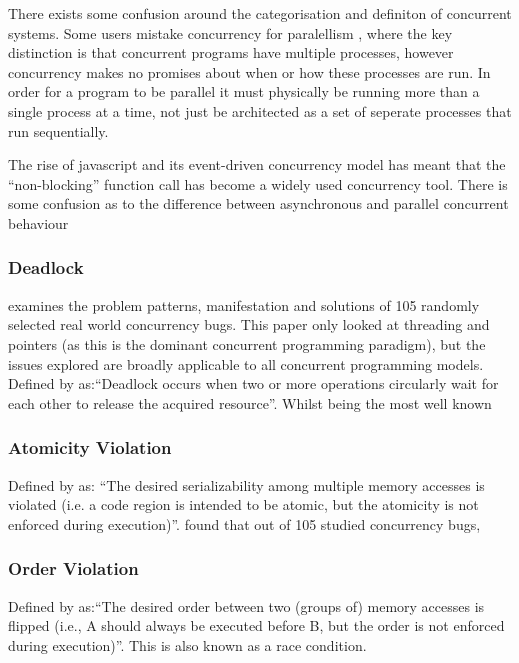 \documentclass{sig-alternate}
\begin{document}
There exists some confusion around the categorisation and definiton of concurrent systems. Some users mistake concurrency for paralellism \cite{pike13:_concur_paral}, where the key distinction is that concurrent programs have multiple processes, however concurrency makes no promises about when or how these processes are run. In order for a program to be parallel it must physically be running more than a single process at a time, not just be architected as a set of seperate processes that run sequentially.

The rise of javascript and its event-driven concurrency model has meant that the ``non-blocking'' function call has become a widely used concurrency tool. There is some confusion as to the difference between asynchronous and parallel concurrent behaviour

\subsubsection{Deadlock}
\cite{shanlu08:_learn_mistak_compr_study_real} examines the problem patterns, manifestation and solutions of 105 randomly selected real world concurrency bugs. This paper only looked at threading and pointers (as this is the dominant concurrent programming paradigm), but the issues explored are broadly applicable to all concurrent programming models.
Defined by \cite{shanlu08:_learn_mistak_compr_study_real} as:``Deadlock occurs when two or more operations circularly wait for each other to release the acquired resource''. Whilst being the most well known 

\subsubsection{Atomicity Violation}
Defined by \cite{shanlu08:_learn_mistak_compr_study_real} as: ``The desired serializability among multiple memory accesses is violated (i.e. a code region is intended to be atomic, but the atomicity is not enforced during execution)''. \cite{shanlu08:_learn_mistak_compr_study_real} found that out of 105 studied concurrency bugs, 

\subsubsection{Order Violation}
Defined by \cite{shanlu08:_learn_mistak_compr_study_real} as:``The desired order between two (groups of) memory accesses is flipped (i.e., A should always be executed before B, but the order is not enforced during execution)''. This is also known as a race condition. 
\end{document}
